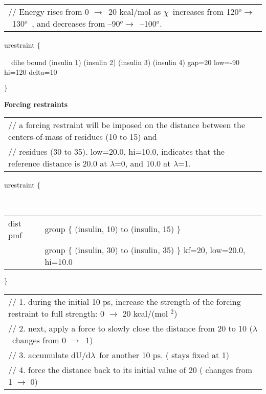 \begin{tabular}{l}
{\footnotesize // Energy rises from 0 }$\rightarrow ${\footnotesize \ 20
kcal/mol as }$\chi ${\footnotesize \ {}increases from 120}$^{o}\rightarrow $
{\footnotesize \ 130}$^{o}${\footnotesize \ , and decreases from --90}$
^{o}\rightarrow ${\footnotesize \ --100}$^{o}${\footnotesize .}
\end{tabular}

urestraint $\{$

~~dihe bound (insulin 1) (insulin 2) (insulin 3) (insulin 4) gap=20 low=-90
hi=120 delta=10

$\}$

{\bf Forcing restraints}

\begin{tabular}{l}
{\footnotesize // a forcing restraint will be imposed on the distance
between the centers-of-mass of residues (10 to 15) and} \\ 
{\footnotesize // residues (30 to 35). low=20.0, hi=10.0, indicates that the
reference distance is 20.0%
at }$\lambda ${\footnotesize =0, and 10.0%
at }$\lambda ${\footnotesize =1.}
\end{tabular}

urestraint $\{$

~~
\begin{tabular}{ll}
dist pmf & group $\{$ (insulin, 10) to (insulin, 15) $\}$ \\ 
& \hspace{0pt}group $\{$ (insulin, 30) to (insulin, 35) $\}$ kf=20,
low=20.0, hi=10.0
\end{tabular}

$\}\medskip $

\begin{tabular}{l}
{\footnotesize // 1. during the initial 10 ps, increase the strength of the
forcing restraint to full strength: 0 }$\rightarrow $ {\footnotesize 20
kcal/(mol %
}$^{2}${\footnotesize )} \\ 
{\footnotesize // 2. next, apply a force to slowly close the distance from
20 %
to 10 %
(}$\lambda ${\footnotesize \ changes from 0 }$\rightarrow ${\footnotesize \
1)} \\ 
{\footnotesize // 3. accumulate dU/d}$\lambda ${\footnotesize \ for another
10 ps. ( stays fixed at 1)} \\ 
{\footnotesize // 4. force the distance back to its initial value of 20 
( changes from 1 }$\rightarrow $ {\footnotesize 0)}
\end{tabular}

